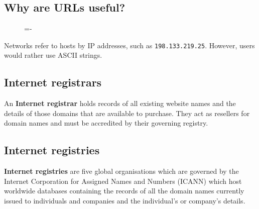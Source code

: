 \documentclass[a4paper]{systems-software}
\begin{document}
\subsection*{Why are URLs useful?}

\begin{figure}[H]
	\lineskip=-\fboxrule
\end{figure}

Networks refer to hosts by IP addresses, such as \texttt{198.133.219.25}. However, users would rather use ASCII strings.


\subsection*{Internet registrars}

An \textbf{Internet registrar} holds records of all existing website names and the details of those domains that are available to purchase. They act as resellers for domain names and must be accredited by their governing registry.


\subsection*{Internet registries}

\textbf{Internet registries} are five global organisations which are governed by the Internet Corporation for Assigned Names and Numbers (ICANN) which host worldwide databases containing the records of all the domain names currently issued to individuals and companies and the individual’s or company’s details.
\end{document}
